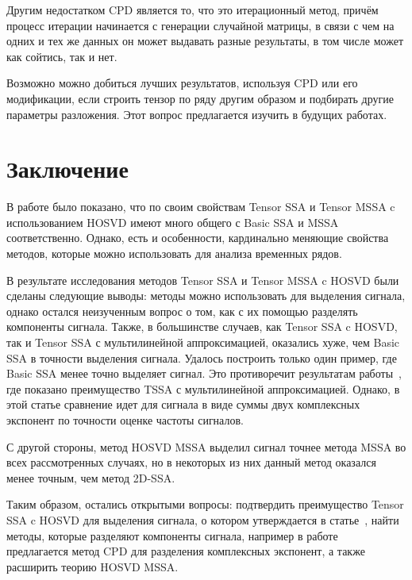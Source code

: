 \documentclass[specialist,
    substylefile = spbu_report.rtx,
    subf,href,colorlinks=true, 12pt]{disser}
\theoremstyle{plain}
\theoremstyle{definition}
\theoremstyle{remark}
\begin{document}
    Другим недостатком CPD является то, что это итерационный метод, причём процесс итерации начинается
    с генерации случайной матрицы, в связи с чем на одних и тех же данных он может выдавать разные результаты, в том
    числе может как сойтись, так и нет.

    Возможно можно добиться лучших результатов, используя CPD или его модификации, если строить тензор по ряду другим образом и подбирать
    другие параметры разложения.
    Этот вопрос предлагается изучить в будущих работах.
    \newpage


    \section{Заключение}\label{sec:conclusion}
    В работе было показано, что по своим свойствам Tensor SSA и Tensor MSSA c использованием HOSVD
    имеют много общего с Basic SSA и MSSA соответственно.
    Однако, есть и особенности, кардинально меняющие свойства методов, которые можно использовать для анализа временных рядов.

    В результате исследования методов Tensor SSA и Tensor MSSA c HOSVD были сделаны следующие выводы:
    методы можно использовать для выделения сигнала, однако остался неизученным вопрос о том,
    как с их помощью разделять компоненты сигнала.
    Также, в большинстве случаев, как Tensor SSA c HOSVD, так и Tensor SSA с мультилинейной аппроксимацией, оказались хуже,
    чем Basic SSA в точности выделения сигнала.
    Удалось построить только один пример, где Basic SSA менее точно выделяет сигнал.
    Это противоречит результатам работы~\cite{hosvd-hooi-separation}, где показано преимущество TSSA с мультилинейной аппроксимацией.
    Однако, в этой статье сравнение идет для сигнала в виде суммы двух комплексных экспонент по точности оценке частоты сигналов.

    С другой стороны, метод HOSVD MSSA выделил сигнал точнее метода MSSA во всех рассмотренных случаях, но в
    некоторых из них данный метод оказался менее точным, чем метод 2D-SSA.

    Таким образом, остались открытыми вопросы: подтвердить преимущество Tensor SSA c HOSVD для выделения сигнала,
    о котором утверждается в статье~\cite{hosvd-hooi-separation}, найти методы, которые разделяют компоненты сигнала,
    например в работе~\cite{cpd-separation} предлагается метод CPD для разделения комплексных экспонент, а также
    расширить теорию HOSVD MSSA.

    
    
\end{document}
